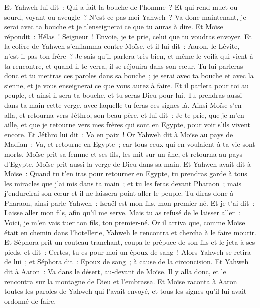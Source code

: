 \begin{multicols}{2}
Et Yahweh lui dit~: Qui a fait la bouche de l'homme~? Et qui rend muet ou sourd, voyant ou aveugle~? N'est-ce pas moi Yahweh~?
Va donc maintenant, je serai avec ta bouche et je t'enseignerai ce que tu auras à dire.
Et Moïse répondit~: Hélas~! Seigneur~! Envoie, je te prie, celui que tu voudras envoyer.
Et la colère de Yahweh s'enflamma contre Moïse, et il lui dit~: Aaron, le Lévite, n'est-il pas ton frère~? Je sais qu'il parlera très bien, et même le voilà qui vient à ta rencontre, et quand il te verra, il se réjouira dans son cœur.
Tu lui parleras donc et tu mettras ces paroles dans sa bouche~; je serai avec ta bouche et avec la sienne, et je vous enseignerai ce que vous aurez à faire.
Et il parlera pour toi au peuple, et ainsi il sera ta bouche, et tu seras Dieu pour lui.
Tu prendras aussi dans ta main cette verge, avec laquelle tu feras ces signes-là.
Ainsi Moïse s'en alla, et retourna vers Jéthro, son beau-père, et lui dit~: Je te prie, que je m'en aille, et que je retourne vers mes frères qui sont en Egypte, pour voir s'ils vivent encore. Et Jéthro lui dit~: Va en paix~!
Or Yahweh dit à Moïse au pays de Madian~: Va, et retourne en Egypte~; car tous ceux qui en voulaient à ta vie sont morts.
Moïse prit sa femme et ses fils, les mit sur un âne, et retourna au pays d'Egypte. Moïse prit aussi la verge de Dieu dans sa main.
Et Yahweh avait dit à Moïse~: Quand tu t'en iras pour retourner en Egypte, tu prendras garde à tous les miracles que j'ai mis dans ta main~; et tu les feras devant Pharaon~; mais j'endurcirai son cœur et il ne laissera point aller le peuple.
Tu diras donc à Pharaon, ainsi parle Yahweh~: Israël est mon fils, mon premier-né.
Et je t'ai dit~: Laisse aller mon fils, afin qu'il me serve. Mais tu as refusé de le laisser aller~: Voici, je m'en vais tuer ton fils, ton premier-né.
Or il arriva que, comme Moïse était en chemin dans l'hotellerie, Yahweh le rencontra et chercha à le faire mourir.
Et Séphora prit un couteau tranchant, coupa le prépuce de son fils et le jeta à ses pieds, et dit~: Certes, tu es pour moi un époux de sang~!
Alors Yahweh se retira de lui~; et Séphora dit~: Epoux de sang~; à cause de la circoncision.
Et Yahweh dit à Aaron~: Va dans le désert, au-devant de Moïse. Il y alla donc, et le rencontra sur la montagne de Dieu et l'embrassa.
Et Moïse raconta à Aaron toutes les paroles de Yahweh qui l'avait envoyé, et tous les signes qu'il lui avait ordonné de faire.

\end{multicols}
